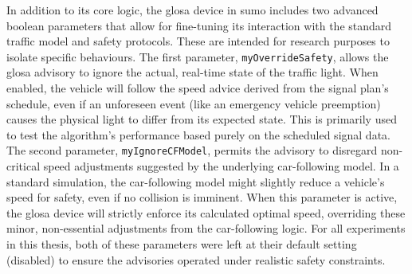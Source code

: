 In addition to its core logic, the \ac{glosa} device in \ac{sumo} includes two advanced boolean parameters that allow for fine-tuning its interaction with the standard traffic model and safety protocols. These are intended for research purposes to isolate specific behaviours.
\mynewline
The first parameter, \texttt{myOverrideSafety}, allows the \ac{glosa} advisory to ignore the actual, real-time state of the traffic light. When enabled, the vehicle will follow the speed advice derived from the signal plan's schedule, even if an unforeseen event (like an emergency vehicle preemption) causes the physical light to differ from its expected state. This is primarily used to test the algorithm's performance based purely on the scheduled signal data.
\mynewline
The second parameter, \texttt{myIgnoreCFModel}, permits the advisory to disregard non-critical speed adjustments suggested by the underlying car-following model. In a standard simulation, the car-following model might slightly reduce a vehicle's speed for safety, even if no collision is imminent. When this parameter is active, the \ac{glosa} device will strictly enforce its calculated optimal speed, overriding these minor, non-essential adjustments from the car-following logic. For all experiments in this thesis, both of these parameters were left at their default setting (disabled) to ensure the advisories operated under realistic safety constraints.